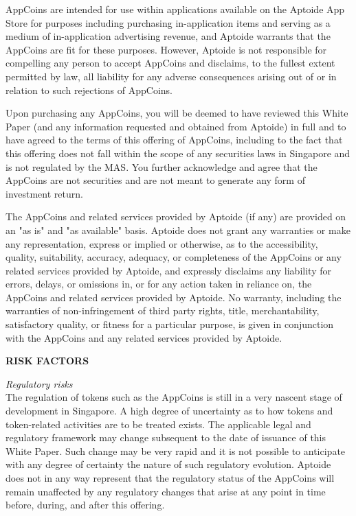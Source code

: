\medskip

AppCoins are intended for use within applications available on the Aptoide App Store for purposes including purchasing in-application items and serving as a medium of in-application advertising revenue, and Aptoide warrants that the AppCoins are fit for these purposes. However, Aptoide is not responsible for compelling any person to accept AppCoins and disclaims, to the fullest extent permitted by law, all liability for any adverse consequences arising out of or in relation to such rejections of AppCoins.

\medskip

Upon purchasing any AppCoins, you will be deemed to have reviewed this White Paper (and any information requested and obtained from Aptoide) in full and to have agreed to the terms of this offering of AppCoins, including to the fact that this offering does not fall within the scope of any securities laws in Singapore and is not regulated by the MAS. You further acknowledge and agree that the AppCoins are not securities and are not meant to generate any form of investment return.

\medskip

The AppCoins and related services provided by Aptoide (if any) are provided on an "as is" and "as available" basis. Aptoide does not grant any warranties or make any representation, express or implied or otherwise, as to the accessibility, quality, suitability, accuracy, adequacy, or completeness of the AppCoins or any related services provided by Aptoide, and expressly disclaims any liability for errors, delays, or omissions in, or for any action taken in reliance on, the AppCoins and related services provided by Aptoide. No warranty, including the warranties of non-infringement of third party rights, title, merchantability, satisfactory quality, or fitness for a particular purpose, is given in conjunction with the AppCoins and any related services provided by Aptoide.

\medskip
\medskip

\textbf{RISK FACTORS}

\medskip

\textit{Regulatory risks}\\
The regulation of tokens such as the AppCoins is still in a very nascent stage of development in Singapore. A high degree of uncertainty as to how tokens and token-related activities are to be treated exists. The applicable legal and regulatory framework may change subsequent to the date of issuance of this White Paper. Such change may be very rapid and it is not possible to anticipate with any degree of certainty the nature of such regulatory evolution. Aptoide does not in any way represent that the regulatory status of the AppCoins will remain unaffected by any regulatory changes that arise at any point in time before, during, and after this offering.

